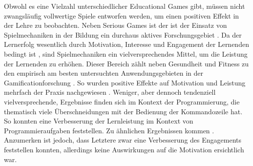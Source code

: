 Obwohl es eine Vielzahl unterschiedlicher Educational Games gibt, müssen nicht zwangsläufig vollwertige Spiele entworfen werden, um einen positiven Effekt in der Lehre zu beobachten. Neben Serious Games ist der ist der Einsatz von Spielmechaniken in der Bildung ein durchaus aktives Forschungsgebiet \cite{ibanez_gamification_2014,landers_enhancing_2017}. Da der Lernerfolg wesentlich durch Motivation, Interesse und Engagement der Lernenden bedingt ist \cite{astin_student_1984}, sind Spielmechaniken ein vielversprechendes Mittel, um die Leistung der Lernenden zu erhöhen.
Dieser Bereich zählt neben Gesundheit und Fitness zu den empirisch am besten untersuchten Anwendungsgebieten in der Gamificationforschung \cite{koivisto_rise_2019}.
So wurden positive Effekte auf Motivation und Leistung mehrfach der Praxis nachgewiesen \cite{ibanez_gamification_2014,hamzah_influence_2015,strmecki_gamification_2015}. Weniger, aber dennoch tendenziell vielversprechende, Ergebnisse finden sich im Kontext der Programmierung, die thematisch viele Überschneidungen mit der Bedienung der Kommandozeile hat. So konnten  eine Verbesserung der Lernleistung im Kontext von Programmieraufgaben feststellen. Zu ähnlichen Ergebnissen kommen \cite{ortiz_gamification_2017}. Anzumerken ist jedoch, dass Letztere zwar eine Verbesserung des Engagements feststellen konnten, allerdings keine Auswirkungen auf die Motivation ersichtlich war.



